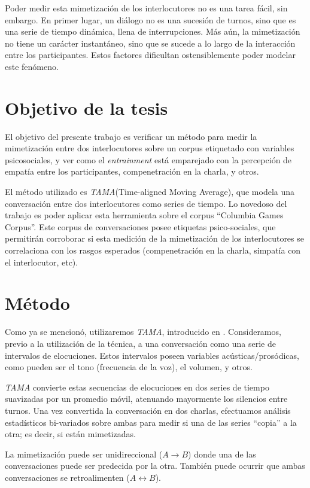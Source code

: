 \documentclass[a4paper,11pt]{article}
\begin{document}
Poder medir esta mimetización de los interlocutores no es una tarea fácil, sin embargo. En primer lugar, un diálogo no es una sucesión de turnos, sino que es una serie de tiempo dinámica, llena de interrupciones. Más aún, la mimetización no tiene un carácter instantáneo, sino que se sucede a lo largo de la interacción entre los participantes. Estos factores dificultan ostensiblemente poder modelar este fenómeno.

\section{Objetivo de la tesis}

El objetivo del presente trabajo es verificar un método para medir la mimetización entre dos interlocutores sobre un corpus etiquetado con variables psicosociales, y ver como el \emph{entrainment} está emparejado con la percepción de empatía entre los participantes, compenetración en la charla, y otros.

El método utilizado es \emph{TAMA}(Time-aligned Moving Average), que modela una conversación entre dos interlocutores como series de tiempo. Lo novedoso del trabajo es poder aplicar esta herramienta sobre el corpus ``Columbia Games Corpus''. Este corpus de conversaciones posee etiquetas psico-sociales, que permitirán corroborar si esta medición de la mimetización de los interlocutores se correlaciona con los rasgos esperados (compenetración en la charla, simpatía con el interlocutor, etc).

\section{Método}

Como ya se mencionó, utilizaremos \emph{TAMA}, introducido en \cite{KOU2009}. Consideramos, previo a la utilización de la técnica, a una conversación como una serie de intervalos de elocuciones. Estos intervalos poseen variables acústicas/prosódicas, como pueden ser el tono (frecuencia de la voz), el volumen, y otros.

\emph{TAMA} convierte estas secuencias de elocuciones en dos series de tiempo suavizadas por un promedio móvil, atenuando mayormente los silencios entre turnos. Una vez convertida la conversación en dos charlas, efectuamos análisis estadísticos bi-variados sobre ambas para medir si una de las series ``copia'' a la otra; es decir, si están mimetizadas.

La mimetización puede ser unidireccional ($A \rightarrow B$) donde una de las conversaciones puede ser predecida por la otra. También puede ocurrir que ambas conversaciones se retroalimenten ($A \leftrightarrow B$).
\end{document}
